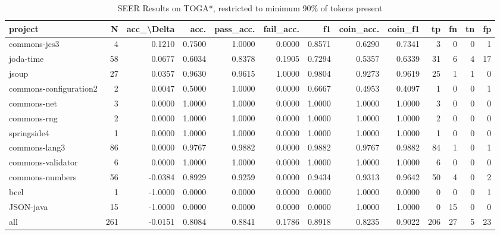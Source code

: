\begin{table}
\centering
\caption{SEER Results on TOGA*, restricted to minimum 90\% of tokens present}
\label{tab:toga_results_10}
\begin{tabular}{lrrrrrrrrrrrr}
\toprule
                project &    N &  acc\_\textbackslash Delta &    acc. &  pass\_acc. &  fail\_acc. &      f1 &  coin\_acc. &  coin\_f1 &   tp &  fn &  tn &  fp \\
\midrule
           commons-jcs3 &    4 &      0.1210 &  0.7500 &     1.0000 &     0.0000 &  0.8571 &     0.6290 &   0.7341 &    3 &   0 &   0 &   1 \\
              joda-time &   58 &      0.0677 &  0.6034 &     0.8378 &     0.1905 &  0.7294 &     0.5357 &   0.6339 &   31 &   6 &   4 &  17 \\
                  jsoup &   27 &      0.0357 &  0.9630 &     0.9615 &     1.0000 &  0.9804 &     0.9273 &   0.9619 &   25 &   1 &   1 &   0 \\
 commons-configuration2 &    2 &      0.0047 &  0.5000 &     1.0000 &     0.0000 &  0.6667 &     0.4953 &   0.4097 &    1 &   0 &   0 &   1 \\
            commons-net &    3 &      0.0000 &  1.0000 &     1.0000 &     0.0000 &  1.0000 &     1.0000 &   1.0000 &    3 &   0 &   0 &   0 \\
            commons-rng &    2 &      0.0000 &  1.0000 &     1.0000 &     0.0000 &  1.0000 &     1.0000 &   1.0000 &    2 &   0 &   0 &   0 \\
            springside4 &    1 &      0.0000 &  1.0000 &     1.0000 &     0.0000 &  1.0000 &     1.0000 &   1.0000 &    1 &   0 &   0 &   0 \\
          commons-lang3 &   86 &      0.0000 &  0.9767 &     0.9882 &     0.0000 &  0.9882 &     0.9767 &   0.9882 &   84 &   1 &   0 &   1 \\
      commons-validator &    6 &      0.0000 &  1.0000 &     1.0000 &     0.0000 &  1.0000 &     1.0000 &   1.0000 &    6 &   0 &   0 &   0 \\
        commons-numbers &   56 &     -0.0384 &  0.8929 &     0.9259 &     0.0000 &  0.9434 &     0.9313 &   0.9642 &   50 &   4 &   0 &   2 \\
                   bcel &    1 &     -1.0000 &  0.0000 &     0.0000 &     0.0000 &  0.0000 &     1.0000 &   0.0000 &    0 &   0 &   0 &   1 \\
              JSON-java &   15 &     -1.0000 &  0.0000 &     0.0000 &     0.0000 &  0.0000 &     1.0000 &   1.0000 &    0 &  15 &   0 &   0 \\
                    all &  261 &     -0.0151 &  0.8084 &     0.8841 &     0.1786 &  0.8918 &     0.8235 &   0.9022 &  206 &  27 &   5 &  23 \\
\bottomrule
\end{tabular}
\end{table}
